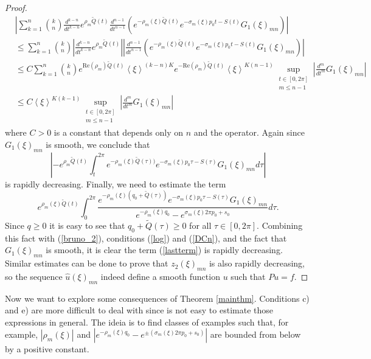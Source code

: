 \documentclass[sn-mathphys-num]{sn-jnl}%
\numberwithin{equation}{section}
\theoremstyle{thmstyleone}
\theoremstyle{thmstyletwo}
\theoremstyle{thmstylethree}
\renewcommand{\Re}{\textrm{Re}}
\def\jp#1{{\left\langle{#1}\right\rangle}}
\begin{document}
\begin{proof}
 \begin{align}
 	& \left| \sum_{k=1}^n \binom{k}{n} \frac{d^{k-n}}{dt^{k-n}} e^{\rho_m \widetilde{Q}(t)} \frac{d^{n-1}}{dt^{n-1}} \left(e^{-\rho_m(\xi) \widetilde{Q}(t)}e^{-\sigma_m(\xi)p_0 t -S(t)}G_1(\xi)_{mn} \right) \right| \nonumber \\
 	& \leq \sum_{k=1}^n \binom{k}{n} \left| \frac{d^{k-n}}{dt^{k-n}} e^{\rho_m \widetilde{Q}(t)}\right| \left|  \frac{d^{n-1}}{dt^{n-1}} \left(e^{-\rho_m(\xi) \widetilde{Q}(t)}e^{-\sigma_m(\xi)p_0 t -S(t)}G_1(\xi)_{mn} \right) \right| \nonumber \\
 	& \leq C \sum_{k=1}^n \binom{k}{n} e^{\Re(\rho_m) \widetilde{Q}(t)} \jp{\xi}^{(k-n)K} e^{-\Re(\rho_m)\widetilde{Q}(t)} \jp{\xi}^{K(n-1)}\sup_{\substack{t \in [0,2\pi] \\ m\leq n-1}} \left|\frac{d^{m}}{dt^{m}}G_1(\xi)_{mn} \right| \nonumber \\
    & \leq C \jp{\xi}^{K(k-1)} \sup_{\substack{t \in [0,2\pi] \\ m\leq n-1}} \left|\frac{d^{m}}{dt^{m}}G_1(\xi)_{mn} \right|
 \end{align}
 where $C>0$ is a constant that depends only on $n$ and the operator. Again since $G_1(\xi)_{mn}$ is smooth, we conclude that 
 $$\left| -e^{\rho_m \widetilde{Q}(t)}\int_t^{2\pi}e^{-\rho_m(\xi) \widetilde{Q}(\tau))}e^{-\sigma_m(\xi)p_0 \tau -S(\tau)}G_1(\xi)_{mn}d\tau \right|$$
 is rapidly decreasing. Finally, we need to estimate the term
 \begin{equation}\label{lastterm}
 e^{\rho_m(\xi)\widetilde{Q}(t)} \int_0^{2\pi} \frac{ e^{-\rho_m(\xi)(q_0+\widetilde{Q}(\tau))}e^{-\sigma_m(\xi)p_0 \tau-S(\tau)}G_1(\xi)_{mn}}{ e^{-\rho_m(\xi)q_0}-e^{\sigma_m(\xi)2\pi p_0 +s_0}}d\tau.
 \end{equation} 
 Since $q \geq 0$ it is easy to see that $q_0+\widetilde{Q}(\tau)\geq 0$ for all $ \tau \in [0,2\pi]$. Combining this fact with (\ref{bruno_2}), conditions (\ref{log}) and (\ref{DCn}),  and the fact that $G_1(\xi)_{mn}$ is smooth, it is clear the term (\ref{lastterm}) is rapidly decreasing. Similar estimates can be done to prove that $z_2(\xi)_{mn}$ is also rapidly decreasing, so the sequence $\widehat{u}(\xi)_{mn}$ indeed define a smooth function $u$ such that $Pu=f$.
 \end{proof} 
 
 Now we want to explore some consequences of Theorem \ref{mainthm}. Conditions c) and e) are more difficult to deal with since is not easy to estimate those expressions in general. The ideia is to find classes of examples such that, for example, $|\rho_m(\xi)|$ and $|e^{-\rho_m(\xi)q_0}-e^{\pm(\sigma_m(\xi)2\pi p_0+s_0)}|$ are bounded from below by a positive constant. 
 
\end{document}
